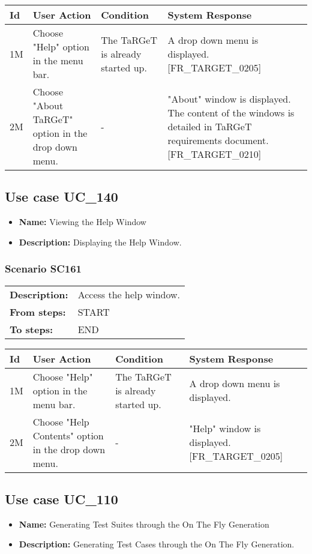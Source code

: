 \documentclass[a4paper,11pt]{article}
\newcommand{\bl}{\\ \hline}
\begin{document}
\begin{tabular}{|p{0.8in}|p{1.6in}|p{1.6in}|p{1.6in}|}
\hline
Id & User Action & Condition & System Response  \bl 
1M & Choose "Help" option in the menu bar.  & The TaRGeT is already started up. & A drop down menu is displayed. [FR_TARGET_0205]
					 \bl 
2M & Choose "About TaRGeT" option in the drop down menu.
					 & - & "About" window is displayed. The content of the windows
						is detailed in TaRGeT requirements document. [FR_TARGET_0210]
					 \bl 
\end{tabular}
\subsection*{Use case UC_140}
\begin{itemize}
\item {\bf Name: }Viewing the Help Window
\item {\bf Description: } Displaying the Help Window.
\end{itemize}
\subsubsection*{Scenario SC161}
\begin{tabular}{p{1in}p{4in}}
{\bf Description:} & Access the help window. \\
{\bf From steps:} & START \\
{\bf To steps:} & END \\
\end{tabular}
 
\begin{tabular}{|p{0.8in}|p{1.6in}|p{1.6in}|p{1.6in}|}
\hline
Id & User Action & Condition & System Response  \bl 
1M & Choose "Help" option in the menu bar. & The TaRGeT is already started up. & A drop down menu is displayed.  \bl 
2M & Choose "Help Contents" option in the drop down menu.
					 & - & "Help" window is displayed. [FR_TARGET_0205] \bl 
\end{tabular}
\subsection*{Use case UC_110}
\begin{itemize}
\item {\bf Name: }Generating Test Suites through the On The Fly Generation
\item {\bf Description: }Generating Test Cases through the On The Fly Generation.
			
\end{itemize}
\end{document}
